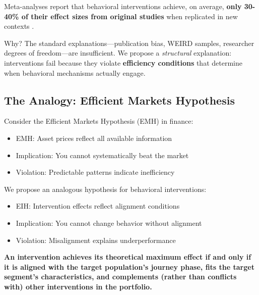 \begin{tcolorbox}[colback=red!5!white, colframe=red!75!black,
    title=The Stylized Fact]
Meta-analyses report that behavioral interventions achieve, on average,
\textbf{only 30-40\% of their effect sizes from original studies} when
replicated in new contexts \citep{dellavigna2022}.
\end{tcolorbox}

Why? The standard explanations---publication bias, WEIRD samples, researcher
degrees of freedom---are insufficient. We propose a \textit{structural} explanation:
interventions fail because they violate \textbf{efficiency conditions} that determine
when behavioral mechanisms actually engage.

\subsection{The Analogy: Efficient Markets Hypothesis}

Consider the Efficient Markets Hypothesis (EMH) in finance:
\begin{itemize}
\item EMH: Asset prices reflect all available information
\item Implication: You cannot systematically beat the market
\item Violation: Predictable patterns indicate inefficiency
\end{itemize}

We propose an analogous hypothesis for behavioral interventions:
\begin{itemize}
\item EIH: Intervention effects reflect alignment conditions
\item Implication: You cannot change behavior without alignment
\item Violation: Misalignment explains underperformance
\end{itemize}

\begin{tcolorbox}[colback=yellow!5!white, colframe=yellow!75!black,
    title=The Efficient Intervention Hypothesis (Informal)]
\textbf{An intervention achieves its theoretical maximum effect if and only if
it is aligned with the target population's journey phase, fits the target segment's
characteristics, and complements (rather than conflicts with) other interventions
in the portfolio.}
\end{tcolorbox}


